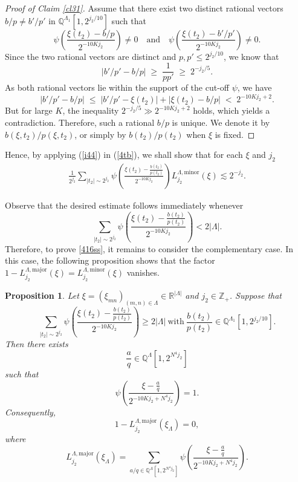 \documentclass[10pt,a4paper]{amsart}
\newtheorem{proposition}{Proposition}\numberwithin{proposition}{section}
\numberwithin{equation}{section}
\begin{document}
 

\begin{proof}[Proof of Claim \ref{cl31}]
  Assume that there exist two distinct rational vectors $b/p \neq b'/p'$ in $\mathbb{Q}^{\Lambda_1}[1,2^{j_2/10}] $ such that
\[
\psi\!\left(\frac{\xi(t_2)-b/p}{2^{-10K j_2}}\right)\neq 0
\quad \text{and} \quad 
\psi\!\left(\frac{\xi(t_2)-b'/p'}{2^{-10K j_2}}\right)\neq 0.
\]
Since the two rational vectors are distinct and  $p,p'\le 2^{j_2/10}$, we know that
\[
|b'/p' - b/p| \;\ge\; \frac{1}{pp'} \;\ge\; 2^{-j_2/5}.
\]
As both rational vectors lie within the support of the cut-off $\psi$, we  have
\[
|b'/p' - b/p|
\;\le\; |b'/p' - \xi(t_2)| + |\xi(t_2)-b/p|
\;<\; 2^{-10K j_2 + 2}.
\]
But for large $K$, the inequality $2^{-j_2/5} \gg 2^{-10K j_2 + 2}$ holds, which yields a contradiction. 
Therefore, such a rational $b/p$ is unique. We denote it by $b(\xi,t_2)/p(\xi,t_2)$, or simply by $b(t_2)/p(t_2)$ when $\xi$ is fixed. 
\end{proof} 
Hence,  by applying  (\ref{i44})  in (\ref{4tb}),
we shall show that  for each $\xi$ and $j_2$ 
\begin{align} \label{416ss}
  \frac{1}{2^{j_2}}
\sum_{|t_2|\sim 2^{j_2}}
\psi\!\left(
\frac{\xi(t_2)-\frac{b(t_2)}{p(t_2)}}{2^{-10Kj_2}}
\right)
L^{\Lambda,\mathrm{minor}}_{j_2}(\xi)
\lesssim 2^{-j_2}.
\end{align}
  

Observe that the desired estimate follows immediately whenever
\[
\sum_{|t_2|\sim 2^{j_2}}
\psi\!\left(
\frac{\xi(t_2)-\frac{b(t_2)}{p(t_2)}}{2^{-10Kj_2}}
\right)
<2|\Lambda|.
\]
   Therefore,  to prove \eqref{416ss}, it remains to consider the complementary case. In this case, the following proposition shows that the factor
$1-L^{\Lambda,\mathrm{major}}_{j_2}(\xi) =L^{\Lambda,\mathrm{minor}}_{j_2}(\xi) $ vanishes.

\begin{proposition}\label{prop6100}
Let $\xi=(\xi_{mn})_{(m,n)\in\Lambda}\in\mathbb R^{|\Lambda|}$ and
$j_2\in\mathbb Z_+$. Suppose that
\begin{equation}\label{420s}
\sum_{|t_2|\sim 2^{j_2}}
\psi\!\left(
\frac{\xi(t_2)-\frac{b(t_2)}{p(t_2)}}{2^{-10Kj_2}}
\right)
\ge 2|\Lambda|
\ \text{with} \
\frac{b(t_2)}{p(t_2)}
\in\mathbb Q^{\Lambda_1}[1,2^{j_2/10}].
\end{equation}
Then there exists
\[
\frac{a}{q}\in\mathbb Q^\Lambda[1,2^{N^4j_2}]
\]
such that
\begin{equation}\label{pkn}
\psi\!\left(
\frac{\xi-\frac{a}{q}}{2^{-10Kj_2+N^4j_2}}
\right)=1.
\end{equation}
Consequently,
\[
1-L^{\Lambda,\mathrm{major}}_{j_2}(\xi_\Lambda)=0,
\]
where
\[
L^{\Lambda,\mathrm{major}}_{j_2}(\xi_\Lambda)
=
\sum_{a/q\in\mathbb Q^\Lambda[1,2^{N^4j_2}]}
\psi\!\left(
\frac{\xi-\frac{a}{q}}{2^{-10Kj_2+N^4j_2}}
\right).
\]
\end{proposition}
 
\end{document}
